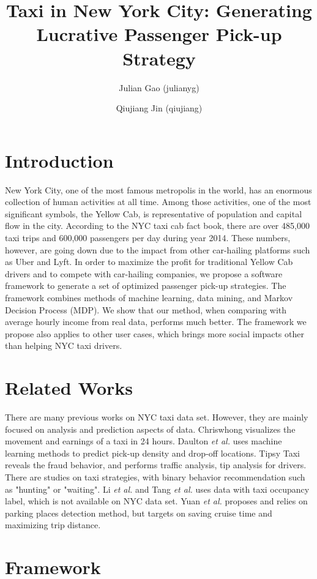 \documentclass[letterpaper, 10 pt, conference]{ieeeconf}
\title{\LARGE \bf Taxi in New York City: Generating Lucrative Passenger Pick-up Strategy}
\author[1]{Julian Gao (julianyg)}
\affil[1]{Stanford University \authorcr
  julianyg@stanford.edu}
\author[2]{Qiujiang Jin (qiujiang)}
\affil[2]{Stanford University \authorcr
  qiujiang@stanford.edu}
\begin{document}
\maketitle
\section{Introduction}
New York City, one of the most famous metropolis in the world, has an enormous collection of human activities at all time. Among those activities, one of the most significant symbols, the Yellow Cab, is representative of population and capital flow in the city. According to the NYC taxi cab fact book\cite{factbook}, there are over 485,000 taxi trips and 600,000 passengers per day during year 2014. These numbers, however, are going down due to the impact from other car-hailing platforms such as Uber and Lyft. In order to maximize the profit for traditional Yellow Cab drivers and to compete with car-hailing companies, we propose a software framework to generate a set of optimized passenger pick-up strategies. The framework combines methods of machine learning, data mining, and Markov Decision Process (MDP). We show that our method, when comparing with average hourly income from real data, performs much better. The framework we propose also applies to other user cases, which brings more social impacts other than helping NYC taxi drivers.
\section{Related Works}
There are many previous works on NYC taxi data set. However, they are mainly focused on analysis and prediction aspects of data. Chriswhong visualizes the movement and earnings of a taxi in 24 hours\cite{cw}. Daulton \textit{et al.} uses machine learning methods to predict pick-up density and drop-off locations\cite{harvard}. Tipsy Taxi reveals the fraud behavior, and performs traffic analysis, tip analysis for drivers\cite{tipsy}. There are studies on taxi strategies, with binary behavior recommendation such as "hunting" or "waiting". Li \textit{et al.}\cite{li} and Tang \textit{et al.} uses data with taxi occupancy label\cite{tang}, which is not available on NYC data set. Yuan \textit{et al.} proposes and relies on parking places detection method, but targets on saving cruise time and maximizing trip distance\cite{yuan}. 
\section{Framework}
\end{document}
